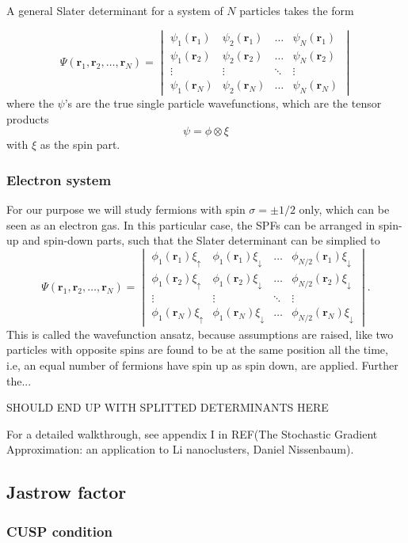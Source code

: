A general Slater determinant for a system of $N$ particles takes the form

\begin{equation}
\Psi(\boldsymbol{r}_1,\boldsymbol{r}_2,\hdots,\boldsymbol{r}_N)=
\begin{vmatrix}
\psi_1(\boldsymbol{r}_1) & \psi_2(\boldsymbol{r}_1) & \hdots & \psi_N(\boldsymbol{r}_1)\\
\psi_1(\boldsymbol{r}_2) & \psi_2(\boldsymbol{r}_2) & \hdots & \psi_N(\boldsymbol{r}_2)\\
\vdots & \vdots & \ddots & \vdots \\
\psi_1(\boldsymbol{r}_N) & \psi_2(\boldsymbol{r}_N) & \hdots & \psi_N(\boldsymbol{r}_N)
\end{vmatrix}
\end{equation}
where the $\psi$'s are the true single particle wavefunctions, which are the tensor products 
\begin{equation}
\psi=\phi\otimes\xi
\end{equation}
with $\xi$ as the spin part. 

\subsubsection{Electron system}
For our purpose we will study fermions with spin $\sigma=\pm 1/2$ only, which can be seen as an electron gas. In this particular case, the SPFs can be arranged in spin-up and spin-down parts, such that the Slater determinant can be simplied to 
\begin{equation}
\Psi(\boldsymbol{r}_1,\boldsymbol{r}_2,\hdots,\boldsymbol{r}_N)=
\begin{vmatrix}
\phi_1(\boldsymbol{r}_1)\xi_{\uparrow} & \phi_1(\boldsymbol{r}_1)\xi_{\downarrow} & \hdots & \phi_{N/2}(\boldsymbol{r}_1)\xi_{\downarrow}\\
\phi_1(\boldsymbol{r}_2)\xi_{\uparrow} & \phi_1(\boldsymbol{r}_2)\xi_{\downarrow} & \hdots & \phi_{N/2}(\boldsymbol{r}_2)\xi_{\downarrow}\\
\vdots & \vdots & \ddots & \vdots \\
\phi_1(\boldsymbol{r}_N)\xi_{\uparrow} & \phi_1(\boldsymbol{r}_N)\xi_{\downarrow} & \hdots & \phi_{N/2}(\boldsymbol{r}_N)\xi_{\downarrow}
\end{vmatrix}.
\end{equation}
This is called the wavefunction ansatz, because assumptions are raised, like two particles with opposite spins are found to be at the same position all the time, i.e, an equal number of fermions have spin up as spin down, are applied. Further the...

SHOULD END UP WITH SPLITTED DETERMINANTS HERE

For a detailed walkthrough, see appendix I in REF(The Stochastic Gradient Approximation: an application to Li nanoclusters, Daniel Nissenbaum). 

\subsection{Jastrow factor}

\subsubsection{CUSP condition}

